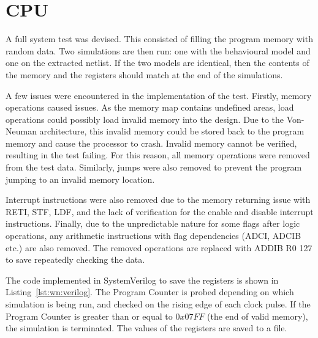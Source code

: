
\section{CPU}

A full system test was devised. 
This consisted of filling the program memory with random data. 
Two simulations are then run: one with the behavioural model and one on the extracted netlist. 
If the two models are identical, then the contents of the memory and the registers should match at the end of the simulations.

A few issues were encountered in the implementation of the test.
Firstly, memory operations caused issues. 
As the memory map contains undefined areas, load operations could possibly load invalid memory into the design.
Due to the Von-Neuman architecture, this invalid memory could be stored back to the program memory and cause the processor to crash. 
Invalid memory cannot be verified, resulting in the test failing. 
For this reason, all memory operations were removed from the test data.
Similarly, jumps were also removed to prevent the program jumping to an invalid memory location. 

Interrupt instructions were also removed due to the memory returning issue with RETI, STF, LDF, and the lack of verification for the enable and disable interrupt instructions. 
Finally, due to the unpredictable nature for some flags after logic operations, any arithmetic instructions with flag dependencies (ADCI, ADCIB etc.) are also removed. 
The removed operations are replaced with ADDIB R0 127 to save repeatedly checking the data. 

The code implemented in SystemVerilog to save the registers is shown in Listing~\ref{lst:wn:verilog}.
The Program Counter is probed depending on which simulation is being run, and checked on the rising edge of each clock pulse. %
If the Program Counter is greater than or equal to $0x07FF$ (the end of valid memory), the simulation is terminated.
The values of the registers are saved to a file. 

